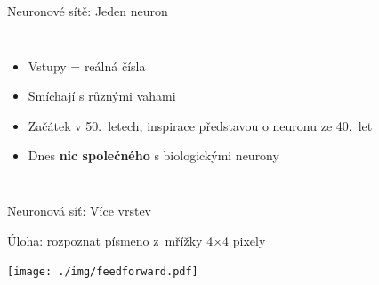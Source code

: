 \documentclass[aspectratio=169,dvipsnames]{beamer}
\begin{document}

\begin{frame}{Neuronové sítě: Jeden neuron}

    \begin{columns}
        

        \begin{itemize}[<+->]

            \item Vstupy = reálná čísla

            \item Smíchají s různými vahami

            \item Začátek v 50.\ letech, inspirace představou o neuronu
                ze 40.\ let

            \item Dnes \textbf{nic společného} s biologickými neurony

        \end{itemize}

    \end{columns}

\end{frame}


\begin{frame}{Neuronová síť: Více vrstev}

    \centering
    Úloha: rozpoznat písmeno z~mřížky 4$\times$4 pixely

    \vspace{10pt}

    \texttt{[image: ./img/feedforward.pdf]}

\end{frame}

\end{document}
